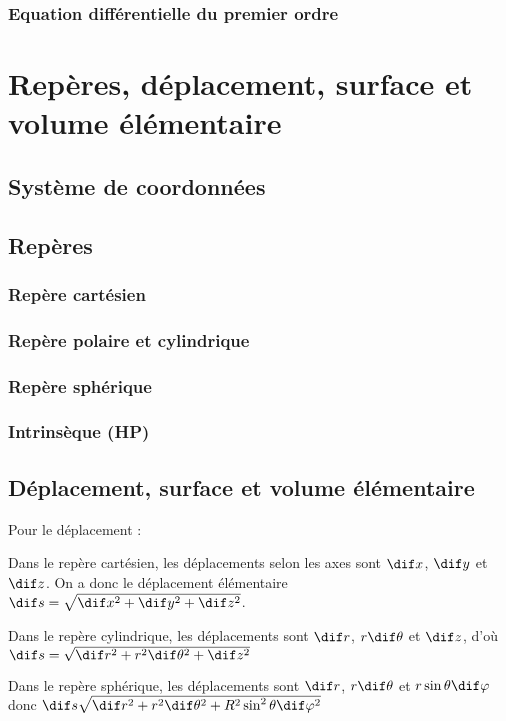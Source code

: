     \subsubsection{Equation différentielle du premier ordre}
    
    \section{Repères, déplacement, surface et volume élémentaire}
    
    \subsection{Système de coordonnées}
    
    \subsection{Repères}
    
    \subsubsection{Repère cartésien}
    
    \subsubsection{Repère polaire et cylindrique}
    
    \subsubsection{Repère sphérique}
    
    \subsubsection{Intrinsèque (HP)}
    
    \subsection{Déplacement, surface et volume élémentaire}
    
    Pour le déplacement :
    
    \begin{enumerate}
        \itt Dans le repère cartésien, les déplacements selon les axes sont $\dif x$, $\dif y$ et $\dif z$. On a donc le déplacement élémentaire $\dif s = \sqrt{\dif x^2 + \dif y^2 + \dif z^2}$.
        
        \itt Dans le repère cylindrique, les déplacements sont $\dif r$, $r \dif \theta$ et $\dif z$, d'où $\dif s = \sqrt{\dif r^2 + r^2\dif \theta^2 + \dif z^2}$
        
        \itt Dans le repère sphérique, les déplacements sont $\dif r$, $r\dif \theta$ et $r\sin \theta\dif \varphi$ donc $\dif s \sqrt{\dif r^2 + r^2\dif \theta^2 + R^2\sin^2 \theta \dif \varphi^2}$
    \end{enumerate}
    
